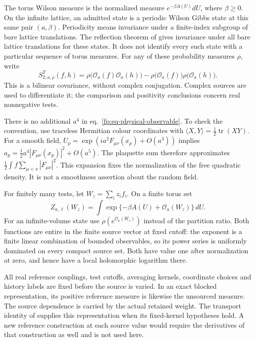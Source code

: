 \documentclass[11pt,letterpaper,reqno]{amsart}
\numberwithin{equation}{section}
\renewcommand{\eqref}[1]{\textup{eq.~\ref{#1}}}
\theoremstyle{definition}
\theoremstyle{remark}
\begin{document}
The torus Wilson measure is the normalized measure
\(e^{-\beta A(U)}dU\), where \(\beta\ge0\). On the infinite
lattice, an admitted state is a periodic Wilson Gibbs state at
this same pair \((a,\beta)\). Periodicity means invariance under
a finite-index subgroup of bare lattice translations. The
reflection theorem of \cite[Theorem B]{LP} gives invariance under
all bare lattice translations for these states. It does not
identify every such state with a particular sequence of torus
measures. For any of these probability measures \(\rho\), write
\begin{equation}\label{fp:eq-physical-covariance}
 S^T_{2;a,\rho}(f,h)
   =\rho\bigl(\mathcal O_a(f)\mathcal O_a(h)\bigr)
      -\rho\bigl(\mathcal O_a(f)\bigr)
       \rho\bigl(\mathcal O_a(h)\bigr).
\end{equation}
This is a bilinear covariance, without complex conjugation.
Complex sources are used to differentiate it; the comparison
and positivity conclusions concern real nonnegative tests.

There is no additional \(a^4\) in
\eqref{fp:eq-physical-observable}. To check the convention, use
traceless Hermitian colour coordinates with
\(\langle X,Y\rangle=\tfrac12\operatorname{tr}(XY)\).
For a smooth field,
\(U_p=\exp(i a^2F_{\mu\nu}(x_p)+O(a^3))\) implies
\(a_p=\tfrac12a^4|F_{\mu\nu}(x_p)|^2+O(a^5)\).
The plaquette sum therefore approximates
\(\tfrac12\int f\sum_{\mu<\nu}|F_{\mu\nu}|^2\).
This expansion fixes the normalization of the free quadratic
density. It is not a smoothness assertion about the random field.

For finitely many tests, let
\(W_z=\sum_i z_i f_i\). On a finite torus set
\[
 Z_{a,\ell}(W_z)=\int
       \exp\{-\beta A(U)+\mathcal O_a(W_z)\}\,dU.
\]
For an infinite-volume state use
\(\rho(e^{\mathcal O_a(W_z)})\) instead of the partition ratio.
Both functions are entire in the finite source vector at fixed
cutoff: the exponent is a finite linear combination of bounded
observables, so its power series is uniformly dominated on every
compact source set. Both have value one after normalization at
zero, and hence have a local holomorphic logarithm there.

All real reference couplings, test cutoffs, averaging kernels,
coordinate choices and history labels are fixed before the
source is varied. In an exact blocked representation, its
positive reference measure is likewise the unsourced measure.
The source dependence is carried by the actual retained weight. The
transport identity of \cite[Proposition 3.1]{SI} supplies this
representation when its fixed-kernel hypotheses hold. A new
reference construction at each source value would require the
derivatives of that construction as well and is not used here.
\end{document}
